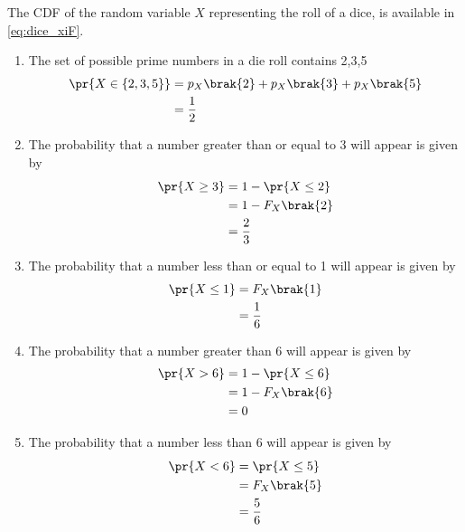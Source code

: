The CDF of the random variable $X$ representing the roll of a dice, is available in \eqref{eq:dice_xiF}.
\begin{enumerate}
\item The set of possible prime numbers in a die roll contains 2,3,5
\begin{align} 
\pr{X \in \{2,3,5\}} &= p_{X}\brak{2} + p_{X}\brak{3} + p_{X}\brak{5}\\
&= \frac{1}{2}
\end{align}
\item The probability that a number greater than or equal to 3 will appear is given by
\begin{align}
\pr{X \geq 3} &= 1 - \pr{X \leq 2}\\
&= 1 - F_{X}\brak{2}\\
&= \frac{2}{3}
\end{align}
\item The probability that a number less than or equal to 1 will appear is given by
\begin{align}
\pr{X \leq 1} &= F_{X}\brak{1}\\
&= \frac{1}{6}
\end{align}
\item The probability that a number greater than 6 will appear is given by
\begin{align}
\pr{X > 6} &= 1 - \pr{X \leq 6}\\
&= 1 - F_{X}\brak{6}\\
&= 0
\end{align}
\item The probability that a number less than 6 will appear is given by
\begin{align}
\pr{X < 6} &= \pr{X \leq 5}\\
&= F_{X}\brak{5}\\
&= \frac{5}{6}
\end{align}
\end{enumerate}



